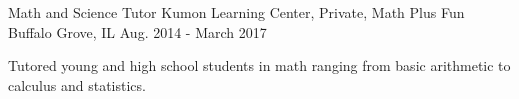 \begin{cventries}
    \cventry
    {Math and Science Tutor}
    {Kumon Learning Center, Private, Math Plus Fun}
    {Buffalo Grove, IL}
    {Aug. 2014 - March 2017}
    {
      \begin{cvitems}
        \item {Tutored young and high school students in math ranging from basic arithmetic to calculus and statistics.}
      \end{cvitems}
    }
\end{cventries}
